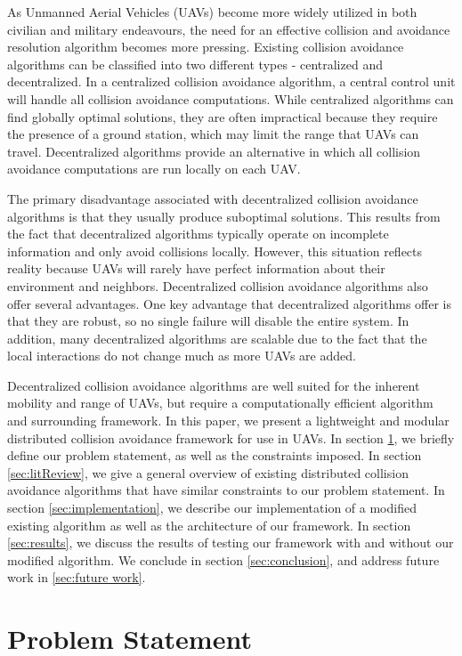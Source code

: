 \documentclass[conference]{IEEEtran}
\begin{document}
As Unmanned Aerial Vehicles (UAVs) become more widely utilized in both civilian and military endeavours, the need for an effective collision and avoidance resolution algorithm becomes more pressing. 
Existing collision avoidance algorithms can be classified into two different types - centralized and decentralized.  
In a centralized collision avoidance algorithm, a central control unit will handle all collision avoidance computations. 
While centralized algorithms can find globally optimal solutions, they are often impractical because they require the presence of a ground station, which may limit the range that UAVs can travel. Decentralized algorithms provide an alternative in which all collision avoidance computations are run locally on each UAV.

The primary disadvantage associated with decentralized collision avoidance algorithms is that they usually produce suboptimal solutions.  This results from the fact that decentralized algorithms typically operate on incomplete information and only avoid collisions locally. However, this situation reflects reality because UAVs will rarely have perfect information about their environment and neighbors. Decentralized collision avoidance algorithms also offer several advantages. One key advantage that decentralized algorithms offer is that they are robust, so no single failure will disable the entire system. In addition, many decentralized algorithms are scalable due to the fact that the local interactions do not change much as more UAVs are added.

Decentralized collision avoidance algorithms are well suited for the inherent mobility and range of UAVs, but require a computationally efficient algorithm and surrounding framework. In this paper, we present a lightweight and modular distributed collision avoidance framework for use in UAVs. In section \ref{sec:problem}, we briefly define our problem statement, as well as the constraints imposed. In section \ref{sec:litReview}, we give a general overview of existing distributed collision avoidance algorithms that have similar constraints to our problem statement. In section \ref{sec:implementation}, we describe our implementation of a modified existing algorithm as well as the architecture of our framework. In section \ref{sec:results}, we discuss the results of testing our framework with and without our modified algorithm. We conclude in section 
\ref{sec:conclusion}, and address future work in \ref{sec:future work}. 

\section{Problem Statement}
\label{sec:problem}
\end{document}
